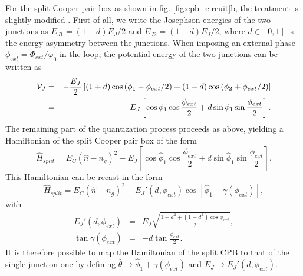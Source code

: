 For the split Cooper pair box as shown in fig. \ref{fig:cpb_circuit}b, the treatment is slightly modified \citep{cottet_implementation_2002}. First of all, we write the Josephson energies of the two junctions as $E_{J1}=(1+d)E_J/2$ and $E_{J2}=(1-d)E_J/2$, where $d\in[0,1]$ is the energy asymmetry between the junctions. When imposing an external phase $\phi_{ext}=\Phi_{ext}/\varphi_0$ in the loop, the potential energy of the two junctions can be written as
%
\begin{eqnarray}
\begin{mathcal}V\end{mathcal}_J & = & -\frac{E_J}{2}\left[(1+d)\cos{(\phi_1-\phi_{ext}/2)}+(1-d)\cos{(\phi_2+\phi_{ext}/2)} \right] \\
& = & -E_J\left[\cos{\phi_1}\cos{\frac{\phi_{ext}}{2}}+d\sin{\phi_1}\sin{\frac{\phi_{ext}}{2}}\right].
\end{eqnarray}
%
The remaining part of the quantization process proceeds as above, yielding a Hamiltonian of the split Cooper pair box of the form
%
\begin{equation}
\hat{H}_{split} = E_C(\hat{n}-n_g)^2-E_J\left[\cos{\hat{\phi}_1}\cos{\frac{\phi_{ext}}{2}}+d\sin{\hat{\phi}_1}\sin{\frac{\phi_{ext}}{2}}\right].
\end{equation}
%
This Hamiltonian can be recast in the form \citep{cottet_implementation_2002}
%
\begin{equation}
\hat{H}_{split} = E_C(\hat{n}-n_g)^2-E_J'(d,\phi_{ext})\cos{[\hat{\phi}_1+\gamma(\phi_{ext})]},
\end{equation}
%
with
%
\begin{eqnarray}
E_J'(d,\phi_{ext}) & = & E_J\sqrt{\frac{1+d^2+(1-d^2)\cos{\phi_{ext}}}{2}}, \\
\tan{\gamma(\phi_{ext})} & = & -d\tan{\frac{\phi_{ext}}{2}}. \label{eq:josephson_energy_modulation}
\end{eqnarray}
%
It is therefore possible to map the Hamiltonian of the split CPB to that of the single-junction one by defining $\hat{\theta}\to\hat{\phi}_1+\gamma(\phi_{ext})$ and $E_J\to E_J'(d,\phi_{ext})$. 

